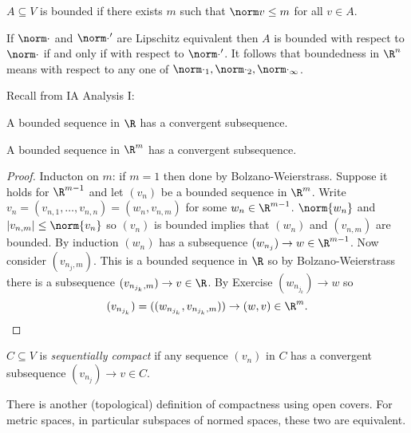\documentclass[a4paper]{article}
\theoremstyle{definition}
\begin{document}
\begin{definition}[Boundedness]
  \(A \subseteq V\) is bounded if there exists \(m\) such that \(\norm v \leq m \) for all \(v\in A\).
\end{definition}

\begin{remark}
  If \(\norm \cdot\) and \(\norm \cdot'\) are Lipschitz equivalent then \(A\) is bounded with respect to \(\norm \cdot\) if and only if with respect to \(\norm \cdot'\). It follows that boundedness in \(\R^n\) means with respect to any one of \(\norm \cdot_1, \norm \cdot_2, \norm \cdot_\infty\).
\end{remark}

Recall from IA Analysis I:
\begin{theorem}
  A bounded sequence in \(\R\) has a convergent subsequence.
\end{theorem}

\begin{corollary}
  A bounded sequence in \(\R^m\) has a convergent subsequence.
\end{corollary}

\begin{proof}
  Inducton on \(m\): if \(m=1\) then done by Bolzano-Weierstrass. Suppose it holds for \(\R^{m-1}\) and let \((v_n)\) be a bounded sequence in \(\R^m\). Write \(v_n = (v_{n,1},\dots,v_{n,n}) = (w_n,v_{n,m})\) for some \(w_n\in \R^{m-1}\). \(\norm{w_n}\) and \(|v_{n,m}| \leq \norm{v_n}\) so \((v_n)\) is bounded implies that \((w_n)\) and \((v_{n,m})\) are bounded. By induction \((w_n)\) has a subsequence \((w_{n_j}) \to w \in \R^{m-1}\). Now consider \((v_{n_j,m})\). This is a bounded sequence in \(\R\) so by Bolzano-Weierstrass there is a subsequence \((v_{n_{j_k},m}) \to v \in\R\). By Exercise \((w_{n_{j_k}}) \to w\) so
  \[
    (v_{n_{j_k}}) = ((w_{n_{j_k}},v_{n_{j_k},m})) \to (w, v) \in \R^m.
  \]
\end{proof}

\begin{definition}
  \(C \subseteq V\) is \emph{sequentially compact} if any sequence \((v_n)\) in \(C\) has a convergent subsequence \((v_{n_j}) \to v \in C\).
\end{definition}

\begin{remark}
  There is another (topological) definition of compactness using open covers. For metric spaces, in particular subspaces of normed spaces, these two are equivalent.
\end{remark}
\end{document}
